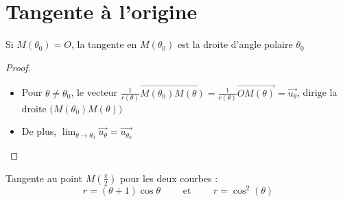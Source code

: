 \section{Tangente à l'origine}


\begin{frame}

\begin{theoreme}
Si $M(\theta_0)=O$, la tangente en $M(\theta_0)$ est la droite 
d'angle polaire $\theta_0$
\end{theoreme}



\vspace*{-5ex}
\pause
\begin{proof}
\vspace*{-0.5ex}
\begin{itemize}
  \item Pour $\theta\neq\theta_0$, le vecteur $\frac{1}{r(\theta)}\overrightarrow{M(\theta_0)M(\theta)}=
\frac{1}{r(\theta)}\overrightarrow{OM(\theta)}
=\overrightarrow{u_\theta}$,
dirige la droite $\big(M(\theta_0)M(\theta)\big)$
  \pause
  \item De plus, $\lim_{\theta \to \theta_0}\overrightarrow{u_\theta}=\overrightarrow{u_{\theta_0}}$ \qedhere
\end{itemize}
\end{proof}



\end{frame}


\begin{frame}
\begin{exemple}
Tangente au point $M(\frac{\pi}{2})$ pour les deux courbes : 
$$r=(\theta+1)\cos \theta \qquad \text{ et } \qquad r=\cos^2(\theta)$$


\begin{itemize}
  
\end{itemize}


\end{exemple}

\end{frame}





